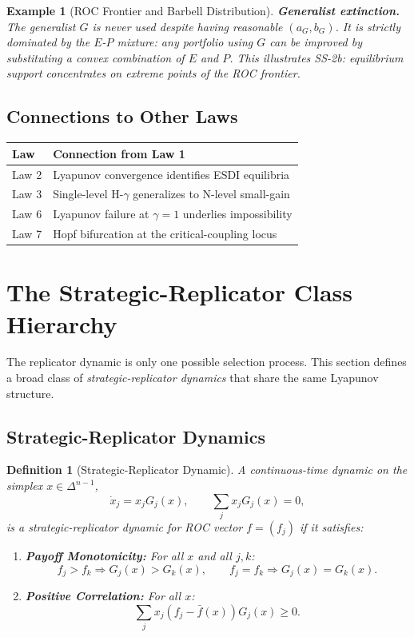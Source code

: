 \documentclass[12pt]{article}
\newtheorem{definition}[theorem]{Definition}
\newtheorem{example}[theorem]{Example}
\begin{document}
\begin{example}[ROC Frontier and Barbell Distribution]
\textbf{Generalist extinction.} The generalist $G$ is never used despite having reasonable $(a_G, b_G)$. It is strictly dominated by the $E$-$P$ mixture: any portfolio using $G$ can be improved by substituting a convex combination of $E$ and $P$. This illustrates SS-2b: equilibrium support concentrates on extreme points of the ROC frontier.
\end{example}

\subsection{Connections to Other Laws}

\begin{center}
\begin{tabular}{ll}
\toprule
\textbf{Law} & \textbf{Connection from Law 1} \\
\midrule
Law 2 & Lyapunov convergence identifies ESDI equilibria \\
Law 3 & Single-level H-$\gamma$ generalizes to N-level small-gain \\
Law 6 & Lyapunov failure at $\gamma = 1$ underlies impossibility \\
Law 7 & Hopf bifurcation at the critical-coupling locus \\
\bottomrule
\end{tabular}
\end{center}

\section{The Strategic-Replicator Class Hierarchy}
\label{sec:sr-class}

The replicator dynamic is only one possible selection process. This section defines a broad class of \emph{strategic-replicator dynamics} that share the same Lyapunov structure.

\subsection{Strategic-Replicator Dynamics}

\begin{definition}[Strategic-Replicator Dynamic]
\label{def:sr-dynamic}
A continuous-time dynamic on the simplex $x \in \Delta^{n-1}$,
\[
\dot{x}_j = x_j G_j(x), \qquad \sum_j x_j G_j(x) = 0,
\]
is a \emph{strategic-replicator dynamic} for ROC vector $f = (f_j)$ if it satisfies:
\begin{enumerate}
    \item \textbf{Payoff Monotonicity:} For all $x$ and all $j, k$:
    \[
    f_j > f_k \Rightarrow G_j(x) > G_k(x), \qquad f_j = f_k \Rightarrow G_j(x) = G_k(x).
    \]
    
    \item \textbf{Positive Correlation:} For all $x$:
    \[
    \sum_j x_j (f_j - \bar{f}(x)) G_j(x) \geq 0.
    \]
\end{enumerate}
\end{definition}
\end{document}
